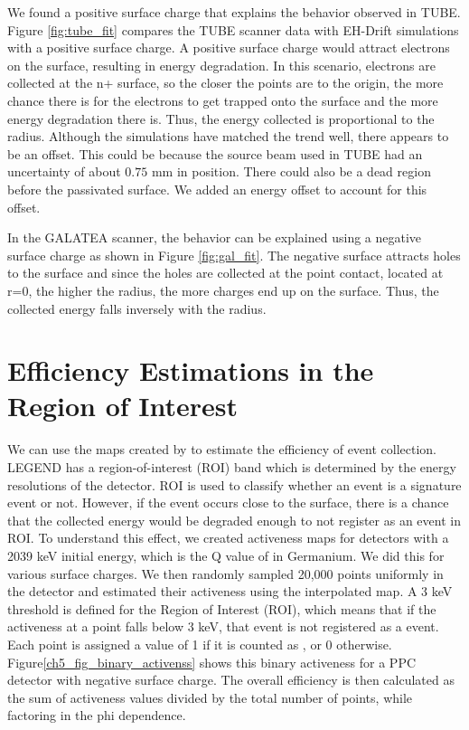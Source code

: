 We found a positive surface charge that explains the behavior observed in TUBE. Figure \ref{fig:tube_fit} compares the TUBE scanner data with EH-Drift simulations with a positive surface charge. A positive surface charge would attract electrons on the surface, resulting in energy degradation. In this scenario, electrons are collected at the n+ surface, so the closer the points are to the origin, the more chance there is for the electrons to get trapped onto the surface and the more energy degradation there is. Thus, the energy collected is proportional to the radius. Although the simulations have matched the trend well, there appears to be an offset. This could be because the source beam used in TUBE had an uncertainty of about $0.75$ mm in position. There could also be a dead region before the passivated surface. We added an energy offset to account for this offset.

In the GALATEA scanner, the behavior can be explained using a negative surface charge as shown in Figure \ref{fig:gal_fit}. The negative surface attracts holes to the surface and since the holes are collected at the point contact, located at r=0, the higher the radius, the more charges end up on the surface. Thus, the collected energy falls inversely with the radius.

\section{Efficiency Estimations in the Region of Interest}
\label{res:2} 
We can use the maps created by {\ehd} to estimate the efficiency of {\onbb} event collection. LEGEND has a region-of-interest (ROI) band which is determined by the energy resolutions of the detector. ROI is used to classify whether an event is a signature event or not. However, if the event occurs close to the surface, there is a chance that the collected energy would be degraded enough to not register as an event in ROI. To understand this effect, we created activeness maps for detectors with a 2039 keV initial energy, which is the Q value of {\onbb} in Germanium. We did this for various surface charges. We then randomly sampled 20,000 points uniformly in the detector and estimated their activeness using the interpolated map. A 3 keV threshold is defined for the Region of Interest (ROI), which means that if the activeness at a point falls below 3 keV, that event is not registered as a {\onbb} event. Each point is assigned a value of 1 if it is counted as {\onbb}, or 0 otherwise. Figure\ref{ch5_fig_binary_activenss} shows this binary activeness for a PPC detector with negative surface charge. The overall efficiency is then calculated as the sum of activeness values divided by the total number of points, while factoring in the phi dependence.

